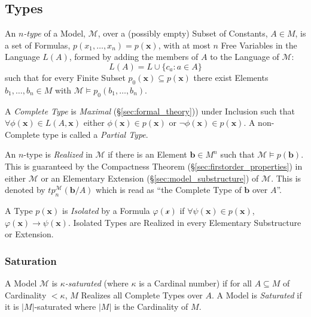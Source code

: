 \subsection{Types}

An \emph{$n$-type} of a Model, $\mathcal{M}$, over a (possibly empty)
Subset of Constants, $A \in M$, is a set of Formulas,
$p(x_1,\ldots,x_n) = p(\mathbf{x})$, with at most $n$ Free Variables
in the Language $L(A)$, formed by adding the members of $A$ to the
Language of $\mathcal{M}$:
\[
    L(A) = L \cup \{ c_a : a \in A \}
\]
such that for every Finite Subset $p_0(\mathbf{x}) \subseteq
p(\mathbf{x})$ there exist Elements $b_1,\ldots,b_n \in M$ with
$\mathcal{M} \vDash p_0(b_1,\ldots,b_n)$.

A \emph{Complete Type} is \emph{Maximal}
(\S\ref{sec:formal_theory})) under Inclusion such that $\forall
\phi(\mathbf{x}) \in L(A,\mathbf{x})$ either $\phi(\mathbf{x}) \in
p(\mathbf{x})$ or $\neg \phi(\mathbf{x}) \in p(\mathbf{x})$. A
non-Complete type is called a \emph{Partial Type}.

An $n$-type is \emph{Realized} in $\mathcal{M}$ if there is an Element
$\mathbf{b} \in M^n$ such that $\mathcal{M} \vDash
p(\mathbf{b})$. This is guaranteed by the Compactness Theorem
(\S\ref{sec:firstorder_properties}) in either $\mathcal{M}$ or an
Elementary Extension (\S\ref{sec:model_substructure}) of
$\mathcal{M}$. This is denoted by $tp_{n}^{\mathcal{M}}(\mathbf{b}/A)$
which is read as ``the Complete Type of $\mathbf{b}$ over $A$''.

A Type $p(\mathbf{x})$ is \emph{Isolated} by a Formula
$\varphi(\mathcal{x})$ if $\forall \psi(\mathbf{x}) \in
p(\mathbf{x})$, $\varphi (\mathbf{x}) \rightarrow
\psi(\mathbf{x})$. Isolated Types are Realized in every Elementary
Substructure or Extension.



\subsubsection{Saturation}\label{sec:model_saturation}

A Model $\mathcal{M}$ is \emph{$\kappa$-saturated} (where $\kappa$ is
a Cardinal number) if for all $A \subseteq M$ of Cardinality $<
\kappa$, $M$ Realizes all Complete Types over $A$. A Model is
\emph{Saturated} if it is $|M|$-saturated where $|M|$ is the
Cardinality of $M$.



